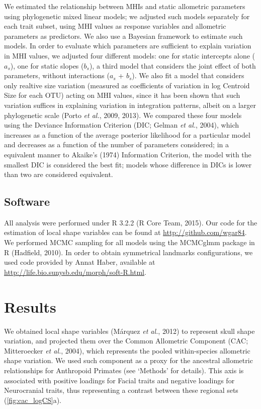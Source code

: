 \documentclass[12pt,twoside]{report}
\begin{document}
We estimated the relationship between MHIs and static allometric
parameters using phylogenetic mixed linear models; we adjusted such
models separately for each trait subset, using MHI values as response
variables and allometric parameters as predictors. We also use a
Bayesian framework to estimate such models. In order to evaluate which
parameters are sufficient to explain variation in MHI values, we
adjusted four different models: one for static intercepts alone ($a_s$),
one for static slopes ($b_s$), a third model that considers the joint
effect of both parameters, without interactions ($a_s$ + $b_s$). We also
fit a model that considers only realtive size variation (measured as
coefficients of variation in log Centroid Size for each OTU) acting on
MHI values, since it has been shown that such variation suffices in
explaining variation in integration patterns, albeit on a larger
phylogenetic scale (Porto \emph{et al.}, 2009, 2013). We compared these
four models using the Deviance Information Criterion (DIC; Gelman
\emph{et al.}, 2004), which increases as a function of the average
posterior likelihood for a particular model and decreases as a function
of the number of parameters considered; in a equivalent manner to
Akaike's (1974) Information Criterion, the model with the smallest DIC
is considered the best fit; models whose difference in DICs is lower
than two are considered equivalent.

\subsection{Software}\label{software-1}

All analysis were performed under R 3.2.2 (R Core Team, 2015). Our code
for the estimation of local shape variables can be found at
\url{http://github.com/wgar84}. We performed MCMC sampling for all
models using the MCMCglmm package in R (Hadfield, 2010). In order to
obtain symmetrical landmarks configurations, we used code provided by
Annat Haber, available at
\url{http://life.bio.sunysb.edu/morph/soft-R.html}.

\section{Results}\label{results-1}

We obtained local shape variables (Márquez \emph{et al.}, 2012) to
represent skull shape variation, and projected them over the Common
Allometric Component (CAC; Mitteroecker \emph{et al.}, 2004), which
represents the pooled within-species allometric shape variation. We used
such component as a proxy for the ancestral allometric relationships for
Anthropoid Primates (see `Methods' for details). This axis is associated
with positive loadings for Facial traits and negative loadings for
Neurocranial traits, thus representing a contrast between these regional
sets (\autoref{fig:cac_logCS}a).
\end{document}
